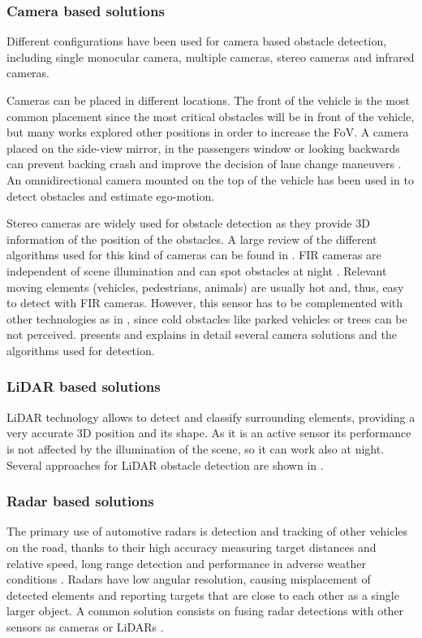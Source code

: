 \documentclass[journal]{IEEEtran}
\begin{document}
\subsubsection{Camera based solutions}
Different configurations have been used for camera based obstacle detection, 
including single monocular camera, multiple cameras, stereo cameras and 
infrared cameras.

Cameras can be placed in different locations. The front of the vehicle is 
the most common placement since the most critical obstacles will be in front of 
the vehicle, but many works explored other positions in order to increase the
FoV. 
A camera placed on the side-view mirror, in the 
passengers window \cite{chang2008real} or looking backwards \cite{suhr2019rearview}
can prevent backing crash and
improve the decision of lane change maneuvers \cite{alonso2008lane, 
song2007lateral, blanc2007larasidecam}. 
An omnidirectional camera mounted
on the top of the vehicle has been used in \cite{gandhi2006vehicle}
to detect obstacles and estimate ego-motion.

Stereo cameras are widely used for obstacle detection as they provide 3D 
information of the position of the obstacles. A large review of the different 
algorithms used for this kind of cameras can be found in \cite{bernini2014real}.
FIR cameras are independent of scene illumination and can spot obstacles at
night \cite{olmeda2013pedestrian}. Relevant moving elements (vehicles, 
pedestrians, animals) are usually hot and, thus, easy to detect with FIR 
cameras. However, this sensor has to be complemented with other technologies
as in \cite{krotosky2007color}, since cold obstacles like parked vehicles or
trees can be not perceived.
\cite{sivaraman2013looking} presents and explains in detail several camera
solutions and the algorithms used for detection.

\subsubsection{LiDAR based solutions}
LiDAR technology allows to detect and classify surrounding elements, providing
a very accurate 3D position and its shape. 
As it is an active sensor its performance is not affected by the illumination 
of the scene, so it can work also at night. Several approaches for LiDAR 
obstacle detection are shown in \cite{li2016vehicle}.

\subsubsection{Radar based solutions}
The primary use of automotive radars is detection and tracking of other 
vehicles on the road, thanks to their high accuracy measuring target 
distances and relative speed, long range detection and performance in adverse 
weather conditions \cite{blanc2004obstacle}. 
Radars have low angular resolution, causing misplacement of detected elements 
and reporting targets that are close to each other as a single larger object.
A common solution consists on fusing radar detections with other sensors as 
cameras \cite{garcia2012data} or LiDARs \cite{gohring2011radar}.
\end{document}

